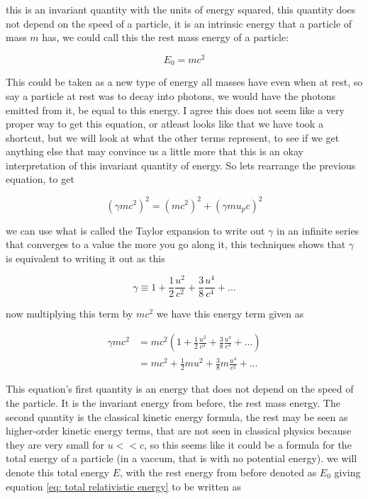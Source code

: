 this is an invariant quantity with the units of energy squared, this quantity does not depend on the speed of a particle, it is an intrinsic energy that a particle of mass $m$ has, we could call this the rest mass energy of a particle:

\begin{equation}
	E_0=mc^2
\end{equation}

This could be taken as a new type of energy all masses have even when at rest, so say a particle at rest was to decay into photons, we would have the photons emitted from it, be equal to this energy.
I agree this does not seem like a very proper way to get this equation, or atleast looks like that we have took a shortcut, but we will look at what the other terms represent, to see if we get anything else that may convince us a little more that this is an okay interpretation of this invariant quantity of energy.
So lets rearrange the previous equation, to get

\begin{equation}
	\label{eq: total relativistic energy}
	\left( \gamma m {c}^2 \right)^2 = ({m}{c}^2)^2 + \left( \gamma {m}{u_p}{c}\right)^2
\end{equation}

we can use what is called the Taylor expansion to write out $\gamma$ in an infinite series that converges to a value the more you go along it, this techniques shows that $\gamma$ is equivalent to writing it out as this

\begin{equation}
	\gamma \equiv 1 + \frac{1}{2}\frac{u^2}{{c}^2} + \frac{3}{8}\frac{u^4}{c^4} + ...
\end{equation}

now multiplying this term by $mc^2$ we have this energy term given as

\begin{equation}
	\begin{aligned}
		\gamma {m}{c}^2 & = {m}{c}^2  \left(1 + \frac{1}{2}\frac{u^2}{{c}^2} + \frac{3}{8}\frac{u^4}{c^4} + ...
		\right)                                                                                                 \\
		                & = {m}{c}^2 + \frac{1}{2}{m}{u}^2 + \frac{3}{8}m\frac{u^4}{{c}^2} + ...
	\end{aligned}
\end{equation}

This equation's first quantity is an energy that does not depend on the speed of the particle.
It is the invariant energy from before, the rest mass energy.
The second quantity is the classical kinetic energy formula, the rest may be seen as higher-order kinetic energy terms, that are not seen in classical physics because they are very small for ${u}<<{c}$, so this seems like it could be a formula for the total energy of a particle (in a vaccum, that is with no potential energy).
we will denote this total energy ${E}$, with the rest energy from before denoted as $E_0$ giving equation \eqref{eq: total relativistic energy} to be written as

